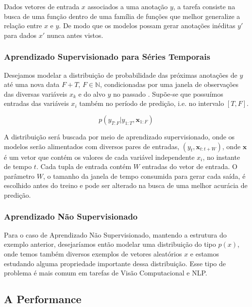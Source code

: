 Dados vetores de entrada $x$ associados a uma anotação $y$, a tarefa consiste na busca de uma
função dentro de uma família de funções que melhor generalize a relação entre
$x$ e $y$. De modo que os modelos possam gerar anotações inéditas $y'$ para
dados $x'$ nunca antes vistos. 


\subsubsection{Aprendizado Supervisionado para Séries Temporais}

Desejamos modelar a distribuição de probabilidade das próximas anotações
de $y$ até uma nova data $F + T$, $F \in \mathbb{N}$, condicionadas por uma janela de
observações das diversas variáveis  $x_k$ e do alvo $y$ no passado
\citep{deepfactors}. Supõe-se que possuímos entradas das
variáveis $x_i$ também no período de predição, i.e. no intervalo $[T,F]$.

\[ p(y_{T:F} | y_{1:T},\textbf{x}_{{1}:F}) \]

A distribuição será buscada por meio de aprendizado supervisionado, onde os
modelos serão alimentados com diversos pares de entradas,
$(y_t,\textbf{x}_{t:t+W})$, onde $\textbf{x}$ é um vetor que contém os valores de
cada variável independente $x_i$, no instante de tempo $t$. Cada tupla de
entrada contém $W$ entradas do vetor de entrada. O parâmetro $W$, o
tamanho da janela de tempo consumida para gerar cada saída, é escolhido antes do
treino e pode ser alterado na busca de uma melhor acurácia de predição.


\subsubsection{Aprendizado Não Supervisionado}

Para o caso de Aprendizado Não Supervisionado, mantendo a estrutura do exemplo
anterior, desejaríamos então modelar uma distribuição do tipo $p(x)$, onde temos
também diversos exemplos de vetores aleatórios $x$ e estamos estudando alguma
propriedade importante dessa distribuição.
Esse tipo de problema é mais comum em tarefas de Visão Computacional e NLP.



\subsection{A Performance}
\label{sec:metricas}

